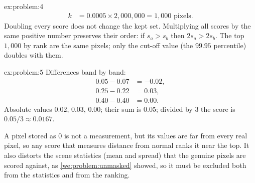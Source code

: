 \begin{solution}{ex:problem:4}
\begin{align*}
k &= 0.0005 \times 2{,}000{,}000 = 1{,}000 \text{ pixels.}
\end{align*}
Doubling every score does not change the kept set. Multiplying all scores by the same positive
number preserves their order: if $s_a > s_b$ then $2s_a > 2s_b$. The top $1{,}000$ by rank are the
same pixels; only the cut-off value (the $99.95$ percentile) doubles with them.
\end{solution}

\begin{solution}{ex:problem:5}
Differences band by band:
\begin{align*}
0.05 - 0.07 &= -0.02,\\
0.25 - 0.22 &= 0.03,\\
0.40 - 0.40 &= 0.00.
\end{align*}
Absolute values $0.02$, $0.03$, $0.00$; their sum is $0.05$; divided by $3$ the score is
$0.05/3 \approx 0.0167$.

A pixel stored as $0$ is not a measurement, but its values are far from every real pixel, so any
score that measures distance from normal ranks it near the top. It also distorts the scene
statistics (mean and spread) that the genuine pixels are scored against, as
\cref{we:problem:unmasked} showed, so it must be excluded both from the statistics and from the
ranking.
\end{solution}

